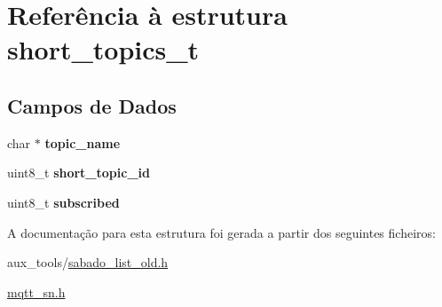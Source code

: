 \hypertarget{structshort__topics__t}{\section{Referência à estrutura short\+\_\+topics\+\_\+t}
\label{structshort__topics__t}
}
\subsection*{Campos de Dados}
\begin{DoxyCompactItemize}
\item 
\hypertarget{structshort__topics__t_a459dbc89d64d4cb2d0e56a6d031cdf25}{char $\ast$ {\bfseries topic\+\_\+name}}\label{structshort__topics__t_a459dbc89d64d4cb2d0e56a6d031cdf25}

\item 
\hypertarget{structshort__topics__t_aa0a77b0dbcddeb15cfc004d18a9a093a}{uint8\+\_\+t {\bfseries short\+\_\+topic\+\_\+id}}\label{structshort__topics__t_aa0a77b0dbcddeb15cfc004d18a9a093a}

\item 
\hypertarget{structshort__topics__t_aa508bc242f4e53ea59cf936e8072aa2d}{uint8\+\_\+t {\bfseries subscribed}}\label{structshort__topics__t_aa508bc242f4e53ea59cf936e8072aa2d}

\end{DoxyCompactItemize}


A documentação para esta estrutura foi gerada a partir dos seguintes ficheiros\+:\begin{DoxyCompactItemize}
\item 
aux\+\_\+tools/\hyperlink{sabado__list__old_8h}{sabado\+\_\+list\+\_\+old.\+h}\item 
\hyperlink{mqtt__sn_8h}{mqtt\+\_\+sn.\+h}\end{DoxyCompactItemize}
